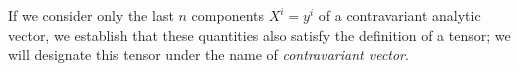 If we consider only the last $n$ components $X^i = y^i$ of a contravariant analytic vector, we establish that these quantities also satisfy the definition of a tensor; we will designate this tensor under the name of {\em contravariant vector}.




























































































































































